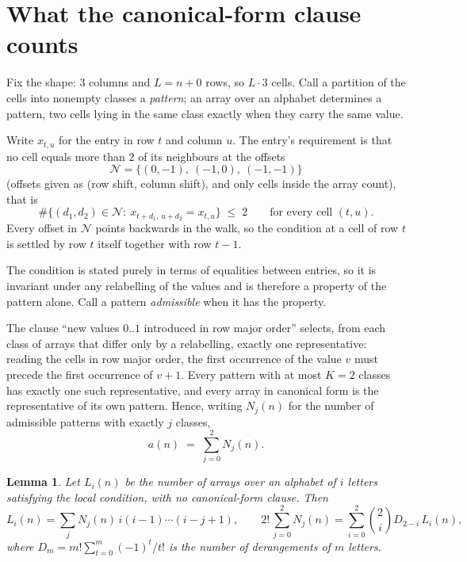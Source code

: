 \documentclass[11pt,a4paper]{article}
\theoremstyle{plain}
\newtheorem{lemma}[theorem]{Lemma}
\theoremstyle{definition}
\begin{document}
\section{What the canonical-form clause counts}

Fix the shape: $3$ columns and $L=n+0$ rows, so $L\cdot3$ cells. Call a
partition of the cells into nonempty classes a \emph{pattern}; an array over an alphabet
determines a pattern, two cells lying in the same class exactly when they carry the same
value.

Write $x_{t,u}$ for the entry in row $t$ and column $u$. The
entry's requirement is that no cell equals more than $2$ of its neighbours at the
offsets
\[
\mathcal N=\{(0,-1),\ (-1,0),\ (-1,-1)\}
\]
(offsets given as (row shift, column shift), and only cells inside the array count),
that is
\begin{equation}\label{eq:loc}
\#\bigl\{(d_1,d_2)\in\mathcal N:\ x_{t+d_1,\,u+d_2}=x_{t,u}\bigr\}\;\le\;2
\qquad\text{for every cell }(t,u).
\end{equation}
Every offset in $\mathcal N$ points backwards in the walk, so the condition at a cell of
row $t$ is settled by row $t$ itself together with row $t-1$.

The condition is stated purely in terms of equalities between entries, so it is invariant
under any relabelling of the values and is therefore a property of the pattern alone. Call a
pattern \emph{admissible} when it has the property.

The clause ``new values $0..1$ introduced in row major order'' selects, from each class
of arrays that differ only by a relabelling, exactly one representative: reading the cells in
row major order, the first occurrence of the value $v$ must precede the first occurrence of
$v+1$. Every pattern with at most $K=2$ classes has exactly one such representative, and
every array in canonical form is the representative of its own pattern. Hence, writing
$N_j(n)$ for the number of admissible patterns with exactly $j$ classes,
\begin{equation}\label{eq:apat}
a(n)\;=\;\sum_{j=0}^{2}N_j(n).
\end{equation}

\begin{lemma}\label{lem:inv}
Let $L_i(n)$ be the number of arrays over an alphabet of $i$ letters satisfying the local
condition, with no canonical-form clause. Then
\[
L_i(n)=\sum_j N_j(n)\,i(i-1)\cdots(i-j+1),
\qquad
2!\,\sum_{j=0}^{2}N_j(n)=\sum_{i=0}^{2}\binom{2}{i}D_{2-i}\,L_i(n),
\]
where $D_m=m!\sum_{t=0}^{m}(-1)^t/t!$ is the number of derangements of $m$ letters.
\end{lemma}
\end{document}
